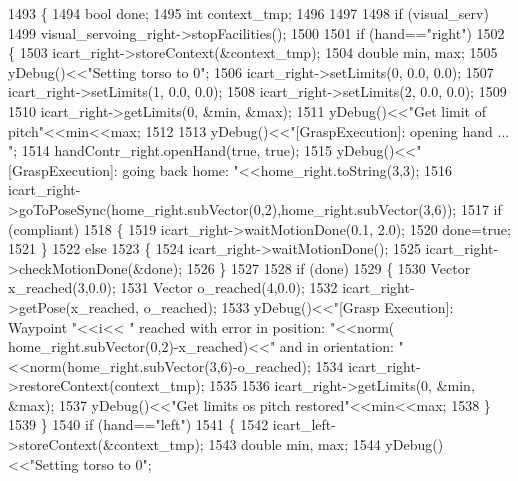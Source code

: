 \begin{DoxyCode}
1493 \{
1494     \textcolor{keywordtype}{bool} done;
1495     \textcolor{keywordtype}{int} context\_tmp;
1496 
1497 
1498     \textcolor{keywordflow}{if} (visual_serv)
1499         visual_servoing_right->stopFacilities();
1500 
1501     \textcolor{keywordflow}{if} (hand==\textcolor{stringliteral}{"right"})
1502     \{
1503         icart\_right->storeContext(&context\_tmp);
1504         \textcolor{keywordtype}{double} min, max;
1505         yDebug()<<\textcolor{stringliteral}{"Setting torso to 0"};
1506         icart\_right->setLimits(0, 0.0, 0.0);
1507         icart\_right->setLimits(1, 0.0, 0.0);
1508         icart\_right->setLimits(2, 0.0, 0.0);
1509 
1510         icart\_right->getLimits(0, &min, &max);
1511         yDebug()<<\textcolor{stringliteral}{"Get limit of pitch"}<<min<<max;
1512 
1513         yDebug()<<\textcolor{stringliteral}{"[GraspExecution]: opening hand ... "};
1514         handContr_right.openHand(\textcolor{keyword}{true}, \textcolor{keyword}{true});
1515         yDebug()<<\textcolor{stringliteral}{"[GraspExecution]: going back home: "}<<home_right.toString(3,3);
1516         icart\_right->goToPoseSync(home_right.subVector(0,2),home_right.subVector(3,6));
1517         \textcolor{keywordflow}{if} (compliant)
1518         \{
1519             icart\_right->waitMotionDone(0.1, 2.0);
1520             done=\textcolor{keyword}{true};
1521         \}
1522         \textcolor{keywordflow}{else}
1523         \{
1524             icart\_right->waitMotionDone();
1525             icart\_right->checkMotionDone(&done);
1526         \}
1527 
1528         \textcolor{keywordflow}{if} (done)
1529         \{
1530              Vector x\_reached(3,0.0);
1531              Vector o\_reached(4,0.0);
1532              icart\_right->getPose(x\_reached, o\_reached);
1533              yDebug()<<\textcolor{stringliteral}{"[Grasp Execution]: Waypoint "}<<i<< \textcolor{stringliteral}{" reached with error in position: "}<<norm(
      home_right.subVector(0,2)-x\_reached)<<\textcolor{stringliteral}{" and in orientation: "}<<norm(home_right.subVector(3,6)-o\_reached);
1534              icart\_right->restoreContext(context\_tmp);
1535 
1536              icart\_right->getLimits(0, &min, &max);
1537              yDebug()<<\textcolor{stringliteral}{"Get limits os pitch restored"}<<min<<max;
1538         \}
1539     \}
1540     \textcolor{keywordflow}{if} (hand==\textcolor{stringliteral}{"left"})
1541     \{
1542         icart\_left->storeContext(&context\_tmp);
1543         \textcolor{keywordtype}{double} min, max;
1544         yDebug()<<\textcolor{stringliteral}{"Setting torso to 0"};

\end{DoxyCode}
